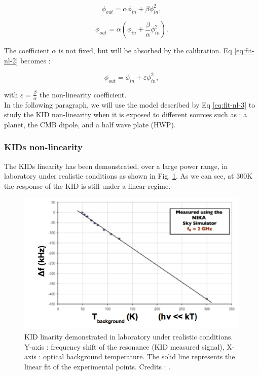 \begin{equation}
\phi_{out} = \alpha \phi_{in} + \beta \phi_{in}^{2} ,
\label{eq:fit-nl-1}
\end{equation}

\begin{equation}
\phi_{out} = \alpha (\phi_{in} + \frac{\beta}{\alpha}  \phi_{in}^{2}).
\label{eq:fit-nl-2}
\end{equation}

The coefficient $\alpha$ is not fixed, but will be absorbed by the calibration. Eq \ref{eq:fit-nl-2} becomes :

\begin{equation}
\phi_{out} = \phi_{in} + \varepsilon \phi_{in}^{2},
\label{eq:fit-nl-3}
\end{equation}

with $\varepsilon = \frac{\beta}{\alpha}$ the non-linearity coefficient. \\
In the following paragraph, we will use the model described by Eq \ref{eq:fit-nl-3} to study the KID non-linearity when it is exposed to different sources such as : a planet, the CMB dipole, and a half wave plate (HWP).

\subsubsection{KIDs non-linearity}

The KIDs linearity has been demonstrated, over a large power range, in laboratory under realistic conditions as shown in Fig. \ref{KID-lin}. As we can see, at 300K the response of the KID is still under a linear regime.

\begin{figure}[h]
\center
	\includegraphics[scale=0.55]{Figures/KID-linearity-Monfardini2014.png}
	\caption{KID linarity demonstrated in laboratory under realistic conditions. Y-axis : frequency shift of the resonance (KID measured signal), X-axis : optical background temperature. The solid line represents the linear fit of the experimental points. Credits : \citet{2014JLTP..176..787M}.}
	\label{KID-lin}
\end{figure}

